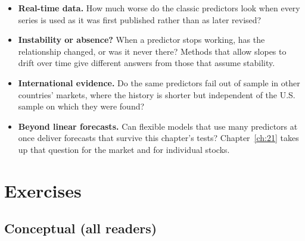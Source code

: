 \begin{itemize}
  \item \textbf{Real-time data.} How much worse do the classic predictors look when every series is used as it was first published rather than as later revised?
  \item \textbf{Instability or absence?} When a predictor stops working, has the relationship changed, or was it never there? Methods that allow slopes to drift over time give different answers from those that assume stability.
  \item \textbf{International evidence.} Do the same predictors fail out of sample in other countries' markets, where the history is shorter but independent of the U.S. sample on which they were found?
  \item \textbf{Beyond linear forecasts.} Can flexible models that use many predictors at once deliver forecasts that survive this chapter's tests? Chapter~\ref{ch:21} takes up that question for the market and for individual stocks.
\end{itemize}

\section*{Exercises}

\subsection*{Conceptual (all readers)}


